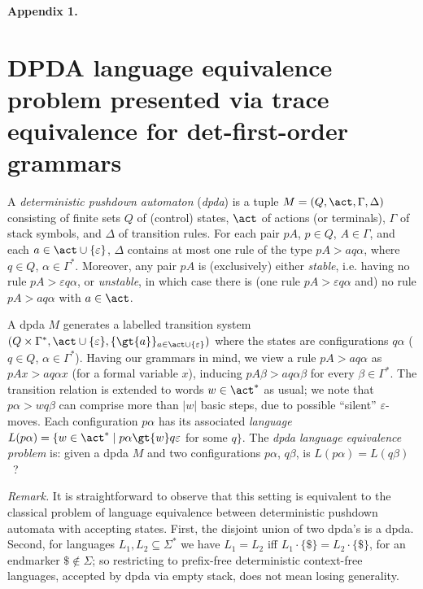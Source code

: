 \documentclass[12pt]{article}
\begin{document}






\noindent
\textbf{Appendix 1.}


\section{DPDA 
language
equivalence problem presented via
trace equivalence for det-first-order grammars}

A \emph{deterministic pushdown automaton} (\emph{dpda})
is a tuple 
$M=(Q,\act,\Gamma,\Delta)$ consisting of
finite sets $Q$ of (control) states, 
$\act$ of actions (or terminals),
$\Gamma$ of stack symbols, and $\Delta$ of transition rules.
For each pair $pA$, $p\in Q$, $A \in \Gamma$, and each 
$a\in\act\cup\{\varepsilon\}$, $\Delta$ contains at most one rule
of the type  $pA \gt{a}q\alpha$, where $q\in Q$, $\alpha\in\Gamma^*$.
Moreover, any pair $pA$ is (exclusively) either \emph{stable}, 
i.e. 
having no rule 
$pA\gt{\varepsilon}q\alpha$, or
\emph{unstable}, in which case there
is (one rule $pA\gt{\varepsilon}q\alpha$ and) no rule
$pA\gt{a}q\alpha$ with $a\in\act$.

A dpda $M$ generates a labelled transition system
$(Q\times \Gamma^*,\act\cup\{\varepsilon\}, 
\{\gt{a}\}_{a\in\act\cup\{\varepsilon\}})$
where the states are
configurations  $q\alpha$ ($q\in Q$, $\alpha\in\Gamma^*$).
Having our grammars in mind, we view a rule $pA\gt{a}q\alpha$
as $pAx\gt{a}q\alpha x$ (for a formal variable $x$), inducing
$pA\beta \gt{a}q\alpha\beta$ for every $\beta\in\Gamma^*$. 
The transition relation is extended to words $w\in\act^*$ 
as usual; we note that $p \alpha \gt{w} q \beta$ 
can comprise more than  $|w|$ basic steps, due
to possible ``silent'' $\varepsilon$-moves.
Each configuration $p \alpha$
has its associated \emph{language}
$L(p \alpha)=\{w\in\act^*\mid p \alpha \gt{w}q \varepsilon$
for some $q \}$.
The \emph{dpda language equivalence problem} is:  
given a dpda $M$ and two configurations
$p \alpha$, $q \beta$,
is $L(p \alpha)=L(q\beta)$~?

\emph{Remark.}
It is straightforward to observe that this setting is
equivalent to the classical problem of language equivalence 
between deterministic pushdown automata with 
accepting states.
First, the disjoint
union of two dpda's is a dpda. Second, for languages
$L_1,L_2\subseteq\Sigma^*$ we have 
$L_1=L_2$ iff
$L_1\cdot\{\$\}=L_2\cdot\{\$\}$, for an endmarker $\$\not\in\Sigma$;
so restricting to prefix-free deterministic context-free languages,
accepted by dpda via empty stack,
does not mean losing generality.
\end{document}
